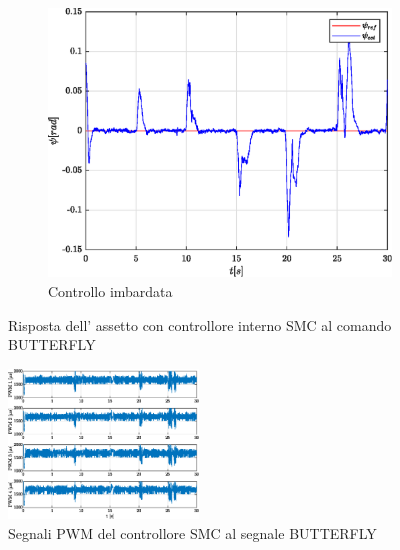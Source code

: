 \begin{figure}
	\hfill
	\begin{subfigure}{0.45\textwidth}
		\centering
		\includegraphics[width=1\textwidth]{Simulazioni/Figure/SMC/BUTTERFLY/AttitudeControlYaw}
		\caption{Controllo imbardata}
		\label{fig:BUTTERFLYyawSMC}
	\end{subfigure}
	\caption{Risposta dell' assetto con controllore interno SMC al comando BUTTERFLY}
\end{figure}

\begin{figure}
	\centering
	\includegraphics[width=0.45\textwidth]{Simulazioni/Figure/SMC/BUTTERFLY/PWM}
	\caption{Segnali PWM del controllore SMC al segnale BUTTERFLY}
	\label{fig:BUTTERFLYPWMSMC}
\end{figure}

